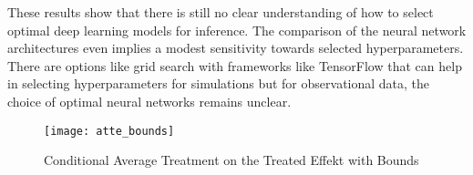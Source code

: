 These results show that there is still no clear understanding of how to select optimal deep learning models for inference.
The comparison of the neural network architectures even implies a modest sensitivity towards selected hyperparameters.
There are options like grid search with frameworks like TensorFlow\textsuperscript{\textregistered} that can help in selecting hyperparameters for simulations but for observational data, the choice of optimal neural networks remains unclear.
\\
\begin{figure}[h]
\centering
\caption{Conditional Average Treatment on the Treated Effekt with Bounds}
\texttt{[image: atte\_bounds]}
\label{fig:atte_bounds}
\end{figure}
